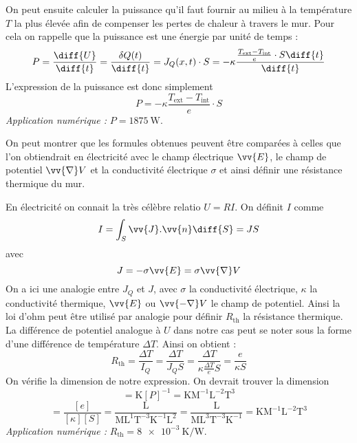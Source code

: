 \documentclass[a4paper,12pt]{article}
\begin{document}
On peut ensuite calculer la puissance qu'il faut fournir au milieu à la température $T$ la plus élevée afin de compenser les pertes de chaleur à travers le mur. Pour cela on rappelle que la puissance est une énergie par unité de temps :
\begin{equation}
	P = \frac{\diff{U}}{\diff{t}} = \frac{\delta Q(t)}{\diff{t}} = J_Q (x,t) \cdot S = - \kappa \frac{\frac{T_\text{ext} - T_\text{int}}{e} \cdot S \diff{t}}{\diff{t}}
\end{equation}
L'expression de la puissance est donc simplement
\begin{equation}
	P = - \kappa \frac{T_\text{ext} - T_\text{int}}{e} \cdot S
\end{equation}
\emph{Application numérique :} $P = \SI{1875}{\watt}$.

On peut montrer que les formules obtenues peuvent être comparées à celles que l'on obtiendrait en électricité avec le champ électrique $\vv{E}$, le champ de potentiel $\vv{\nabla} V$ et la conductivité électrique $\sigma$ et ainsi définir une \og résistance thermique \fg{} du mur.

En électricité on connait la très célèbre relatio $U=RI$. On définit $I$ comme
\begin{equation}
	I = \int_S \vv{J} . \vv{n} \diff{S} = J S
\end{equation}
avec
\begin{equation}
	J = - \sigma \vv{E} = \sigma \vv{\nabla} V
\end{equation}
On a ici une analogie entre $J_Q$ et $J$, avec $\sigma$ la conductivité électrique, $\kappa$ la conductivité thermique, $\vv{E}$ ou $\vv{- \nabla} V$ le champ de potentiel. Ainsi la loi d'ohm peut être utilisé par analogie pour définir $R_\text{th}$ la résistance thermique. La différence de potentiel analogue à $U$ dans notre cas peut se noter sous la forme d'une différence de température $\Delta T$. Ainsi on obtient :
\begin{equation}
	R_\text{th} = \frac{\Delta T}{I_Q} = \frac{\Delta T}{J_Q S} = \frac{\Delta T}{\kappa \frac{\Delta T}{e} S} = \frac{e}{\kappa S}
\end{equation}
On vérifie la dimension de notre expression. On devrait trouver la dimension
\begin{equation}
	[R] = \mathrm{K} [P]^{-1} = \mathrm{K} \mathrm{M}^{-1} \mathrm{L}^{-2} \mathrm{T}^{3}
\end{equation}
\begin{equation}
	[R]	= \frac{[e]}{[\kappa][S]} 
		= \frac{\mathrm{L}}{\mathrm{M}\mathrm{L}^1\mathrm{T}^{-3}\mathrm{K}^{-1}  \mathrm{L}^2} 
		= \frac{\mathrm{L}}{\mathrm{M}\mathrm{L}^3\mathrm{T}^{-3}\mathrm{K}^{-1}}
		= \mathrm{K}\mathrm{M}^{-1}\mathrm{L}^{-2}\mathrm{T}^{3}
\end{equation}
\emph{Application numérique : } $R_\text{th} = \SI{8e-3}{\kelvin\per\watt}$.
\end{document}
